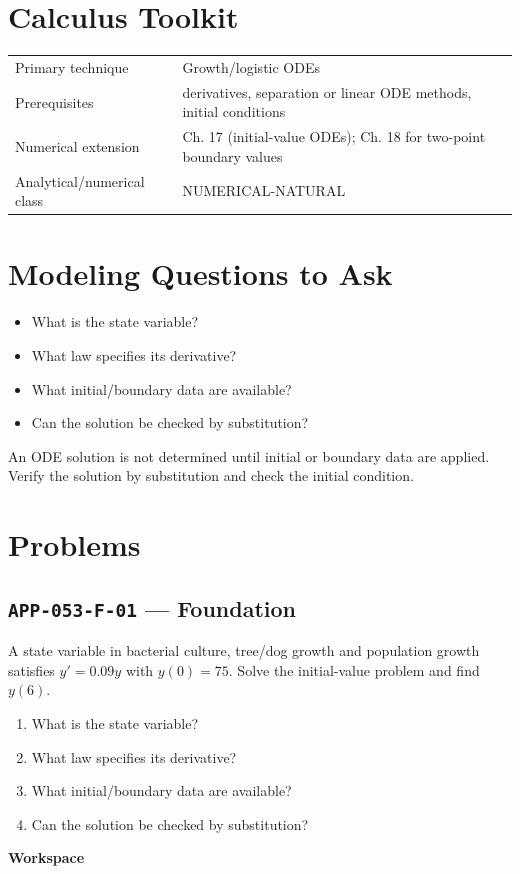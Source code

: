 \documentclass[11pt]{book}
\newcommand{\pid}[1]{\texttt{#1}}
\newcommand{\workspace}{\par\vspace{0.7in}\hrulefill\par\vspace{0.55in}\hrulefill\par}
\begin{document}
\section*{Calculus Toolkit}
\begin{tabularx}{\textwidth}{@{}lX@{}}\toprule
Primary technique & Growth/logistic ODEs \\
Prerequisites & derivatives, separation or linear ODE methods, initial conditions \\
Numerical extension & Ch. 17 (initial-value ODEs); Ch. 18 for two-point boundary values \\
Analytical/numerical class & NUMERICAL-NATURAL \\
\bottomrule\end{tabularx}
\section*{Modeling Questions to Ask}\begin{itemize}
\item What is the state variable?
\item What law specifies its derivative?
\item What initial/boundary data are available?
\item Can the solution be checked by substitution?
\end{itemize}
\begin{errorbox}An ODE solution is not determined until initial or boundary data are applied. Verify the solution by substitution and check the initial condition.\end{errorbox}
\section*{Problems}
\subsection*{\pid{APP-053-F-01} — Foundation}
\begin{problembox}
A state variable in bacterial culture, tree/dog growth and population growth satisfies $y'=0.09y$ with $y(0)=75$. Solve the initial-value problem and find $y(6)$.
\end{problembox}
\begin{promptbox}\begin{enumerate}
\item What is the state variable?
\item What law specifies its derivative?
\item What initial/boundary data are available?
\item Can the solution be checked by substitution?
\end{enumerate}\end{promptbox}
\textbf{Workspace}\workspace
{}
\end{document}
